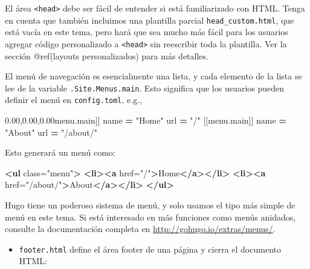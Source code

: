 \documentclass[12pt,]{krantz}
\makeatletter
\newenvironment{Shaded}{\begin{snugshade}}{\end{snugshade}}
\newcommand{\AttributeTok}[1]{\textcolor[rgb]{0.77,0.63,0.00}{#1}}
\newcommand{\KeywordTok}[1]{\textcolor[rgb]{0.13,0.29,0.53}{\textbf{#1}}}
\newcommand{\NormalTok}[1]{#1}
\newcommand{\OperatorTok}[1]{\textcolor[rgb]{0.81,0.36,0.00}{\textbf{#1}}}
\newcommand{\OtherTok}[1]{\textcolor[rgb]{0.56,0.35,0.01}{#1}}
\newcommand{\StringTok}[1]{\textcolor[rgb]{0.31,0.60,0.02}{#1}}
\newcommand{\VariableTok}[1]{\textcolor[rgb]{0.00,0.00,0.00}{#1}}
\providecommand{\tightlist}{%
  \setlength{\itemsep}{0pt}\setlength{\parskip}{0pt}}
\newenvironment{kframe}{%
\medskip{}
\setlength{\fboxsep}{.8em}
 \def\at@end@of@kframe{}%
 \ifinner\ifhmode%
  \def\at@end@of@kframe{\end{minipage}}%
  \begin{minipage}{\columnwidth}%
 \fi\fi%
 \def\FrameCommand##1{\hskip\@totalleftmargin \hskip-\fboxsep
 \colorbox{shadecolor}{##1}\hskip-\fboxsep
     \hskip-\linewidth \hskip-\@totalleftmargin \hskip\columnwidth}%
 \MakeFramed {\advance\hsize-\width
   \@totalleftmargin\z@ \linewidth\hsize
   \@setminipage}}%
 {\par\unskip\endMakeFramed%
 \at@end@of@kframe}
\renewenvironment{Shaded}{\begin{kframe}}{\end{kframe}}
\theoremstyle{definition}
\theoremstyle{definition}
\theoremstyle{definition}
\theoremstyle{remark}
\makeatother
\begin{document}
\begin{itemize}
\begin{itemize}
    El área \texttt{\textless{}head\textgreater{}} debe ser fácil de
    entender si está familiarizado con HTML. Tenga en cuenta que también
    incluimos una plantilla parcial \texttt{head\_custom.html}, que está
    vacía en este tema, pero hará que sea mucho más fácil para los
    usuarios agregar código personalizado a
    \texttt{\textless{}head\textgreater{}} sin reescribir toda la
    plantilla. Ver la sección @ref(layouts personalizados) para más
    detalles.

    El menú de navegación es esencialmente una lista, y cada elemento de
    la lista se lee de la variable \texttt{.Site.Menus.main}. Esto
    significa que los usuarios pueden definir el menú en
    \texttt{config.toml}, e.g.,

\begin{Shaded}
\begin{Highlighting}[]
\NormalTok{[[}\VariableTok{menu}\NormalTok{.}\AttributeTok{main}\NormalTok{]]}
\NormalTok{    name }\OperatorTok{=} \StringTok{"Home"}
\NormalTok{    url }\OperatorTok{=} \StringTok{"/"}
\NormalTok{[[}\VariableTok{menu}\NormalTok{.}\AttributeTok{main}\NormalTok{]]}
\NormalTok{    name }\OperatorTok{=} \StringTok{"About"}
\NormalTok{    url }\OperatorTok{=} \StringTok{"/about/"}
\end{Highlighting}
\end{Shaded}

    Esto generará un menú como:

\begin{Shaded}
\begin{Highlighting}[]
\KeywordTok{<ul}\OtherTok{ class=}\StringTok{"menu"}\KeywordTok{>}
  \KeywordTok{<li><a}\OtherTok{ href=}\StringTok{"/"}\KeywordTok{>}\NormalTok{Home}\KeywordTok{</a></li>}
  \KeywordTok{<li><a}\OtherTok{ href=}\StringTok{"/about/"}\KeywordTok{>}\NormalTok{About}\KeywordTok{</a></li>}
\KeywordTok{</ul>}
\end{Highlighting}
\end{Shaded}

    Hugo tiene un poderoso sistema de menú, y solo usamos el tipo más
    simple de menú en este tema. Si está interesado en más funciones
    como menús anidados, consulte la documentación completa en
    \url{http://gohugo.io/extras/menus/}.

    \begin{itemize}
    \tightlist
    \item
      \texttt{footer.html} define el área footer de
      una página y cierra el documento HTML:
    \end{itemize}


\end{itemize}
\end{itemize}
\end{document}
